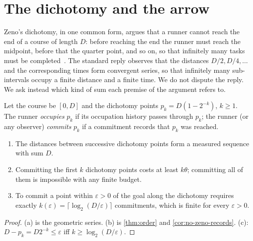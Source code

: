 \documentclass[10pt,twocolumn,a4paper]{article}
\begin{document}
\section{The dichotomy and the arrow}
\label{sec:zeno}

Zeno's dichotomy, in one common form, argues that a runner cannot reach the
end of a course of length $D$: before reaching the end the runner must reach
the midpoint, before that the quarter point, and so on, so that infinitely
many tasks must be completed~\citep{grunbaum1967,salmon2001}. The standard
reply observes that the distances $D/2,D/4,\dots$ and the corresponding times
form convergent series, so that infinitely many sub-intervals occupy a finite
distance and a finite time. We do not dispute the reply. We ask instead which
kind of sum each premise of the argument refers to.

\begin{definition}
\label{def:dichotomy}
Let the course be $[0,D]$ and the dichotomy points $p_k=D(1-2^{-k})$,
$k\ge1$. The runner \emph{occupies} $p_k$ if its occupation history passes
through $p_k$; the runner (or any observer) \emph{commits} $p_k$ if a
commitment records that $p_k$ was reached.
\end{definition}

\begin{proposition}
\label{prop:two-series}
\begin{enumerate}[label=(\alph*),nosep]
\item The distances between successive dichotomy points form a measured
      sequence with sum $D$.
\item Committing the first $k$ dichotomy points costs at least $k\theta$;
      committing all of them is impossible with any finite budget.
\item To commit a point within $\varepsilon>0$ of the goal along the
      dichotomy requires exactly
      $k(\varepsilon)=\lceil\log_2(D/\varepsilon)\rceil$ commitments, which is
      finite for every $\varepsilon>0$.
\end{enumerate}
\end{proposition}

\begin{proof}
(a) is the geometric series. (b) is \cref{thm:order} and
\cref{cor:no-zeno-records}. (c): $D-p_k=D2^{-k}\le\varepsilon$ iff
$k\ge\log_2(D/\varepsilon)$.
\end{proof}
\end{document}
